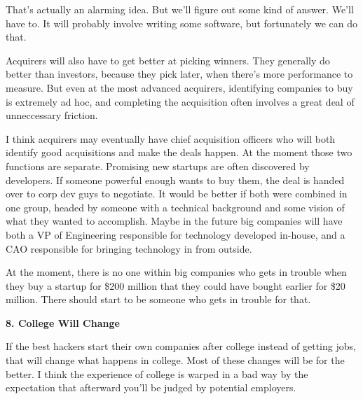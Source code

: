 That's actually an alarming idea. But
                    we'll figure out some kind of answer. We'll have to. It will
                    probably involve writing some software, but fortunately we
                    can do that.

Acquirers will also have to get
                    better at picking winners. They generally do better than
                    investors, because they pick later, when there's more
                    performance to measure. But even at the most advanced
                    acquirers, identifying companies to buy is extremely ad hoc,
                    and completing the acquisition often involves a great deal
                    of unneccessary friction.

I think acquirers may
                    eventually have chief acquisition officers who will both
                    identify good acquisitions and make the deals happen. At the
                    moment those two functions are separate. Promising new
                    startups are often discovered by developers. If someone
                    powerful enough wants to buy them, the deal is handed over
                    to corp dev guys to negotiate. It would be better if both
                    were combined in one group, headed by someone with a
                    technical background and some vision of what they wanted to
                    accomplish. Maybe in the future big companies will have both
                    a VP of Engineering responsible for technology developed
                    in-house, and a CAO responsible for bringing technology in
                    from outside.

At the moment, there is no one
                    within big companies who gets in trouble when they buy a
                    startup for \$200 million that they could have bought earlier
                    for \$20 million. There should start to be someone who gets
                    in trouble for that.

\textbf{8. College Will Change}

If the best hackers start their own companies
                    after college instead of getting jobs, that will change what
                    happens in college. Most of these changes will be for the
                    better. I think the experience of college is warped in a bad
                    way by the expectation that afterward you'll be judged by
                    potential employers.

